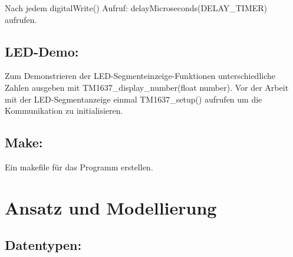 Nach jedem {\ttfamily digital\+Write()} Aufruf\+: {\ttfamily delay\+Microseconds(\+D\+E\+L\+A\+Y\+\_\+\+T\+I\+M\+E\+R)} aufrufen.\hypertarget{md_lerntagebuch_autotoc_md3}{}\subsection{L\+E\+D-\/\+Demo\+:}\label{md_lerntagebuch_autotoc_md3}
Zum Demonstrieren der L\+E\+D-\/\+Segmenteinzeige-\/\+Funktionen unterschiedliche Zahlen ausgeben mit {\ttfamily T\+M1637\+\_\+display\+\_\+number(float number)}. Vor der Arbeit mit der L\+E\+D-\/\+Segmentanzeige einmal {\ttfamily T\+M1637\+\_\+setup()} aufrufen um die Kommunikation zu initialisieren.\hypertarget{md_lerntagebuch_autotoc_md4}{}\subsection{Make\+:}\label{md_lerntagebuch_autotoc_md4}
Ein makefile für das Programm erstellen.\hypertarget{md_lerntagebuch_autotoc_md5}{}\section{Ansatz und Modellierung}\label{md_lerntagebuch_autotoc_md5}
\hypertarget{md_lerntagebuch_autotoc_md6}{}\subsection{Datentypen\+:}\label{md_lerntagebuch_autotoc_md6}

